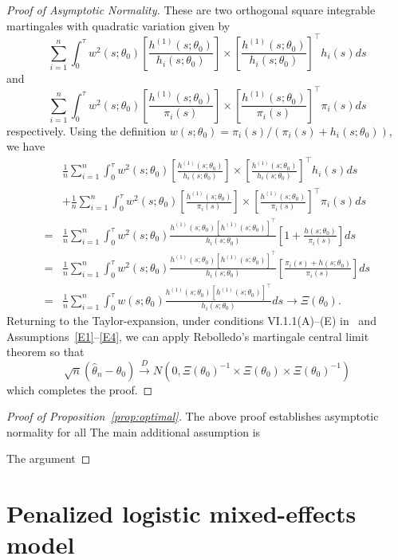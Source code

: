 \documentclass[11pt]{amsart}
\begin{document}
\begin{proof}[Proof of Asymptotic Normality]
These are two orthogonal square integrable martingales with quadratic variation given by
\[
\sum_{i=1}^n \int_0^\tau w^2(s;\theta_0) \left[ \frac{h^{(1)}(s; \theta_0)}{h_i (s;\theta_0)} \right] \times \left[ \frac{h^{(1)} (s;\theta_0)}{h_i (s;\theta_0)} \right]^\top h_i (s) ds
\]
and
\[
\sum_{i=1}^n \int_0^\tau w^2(s;\theta_0) \left[ \frac{h^{(1)}(s; \theta_0)}{\pi_i (s)} \right] \times \left[ \frac{h^{(1)} (s;\theta_0)}{\pi_i (s)} \right]^\top \pi_i (s) ds
\]
respectively.  Using the definition $w(s;\theta_0) = \pi_i(s) / (\pi_i(s)+h_i(s;\theta_0))$, we have
\begin{align*}
&\frac{1}{n} \sum_{i=1}^n \int_0^\tau w^2(s;\theta_0) \left[ \frac{h^{(1)}(s; \theta_0)}{h_i (s;\theta_0)} \right] \times \left[ \frac{h^{(1)} (s;\theta_0)}{h_i (s;\theta_0)} \right]^\top h_i (s) ds \\
&+
\frac{1}{n} \sum_{i=1}^n \int_0^\tau w^2(s;\theta_0) \left[ \frac{h^{(1)}(s; \theta_0)}{\pi_i (s)} \right] \times \left[ \frac{h^{(1)} (s;\theta_0)}{\pi_i (s)} \right]^\top \pi_i (s) ds \\
=& \frac{1}{n} \sum_{i=1}^n \int_0^\tau w^2(s;\theta_0) \frac{h^{(1)}(s; \theta_0) [h^{(1)} (s;\theta_0)]^\top}{h_i (s;\theta_0)} \left[ 1 + \frac{h(s;\theta_0)}{\pi_i (s)} \right] ds \\
=& \frac{1}{n} \sum_{i=1}^n \int_0^\tau w^2(s;\theta_0) \frac{h^{(1)}(s; \theta_0) [h^{(1)} (s;\theta_0)]^\top}{h_i (s;\theta_0)} \left[ \frac{\pi_i (s) + h(s;\theta_0)}{\pi_i (s)} \right] ds \\
=& \frac{1}{n} \sum_{i=1}^n \int_0^\tau w(s;\theta_0) \frac{h^{(1)}(s; \theta_0) [h^{(1)} (s;\theta_0)]^\top}{h_i (s;\theta_0)} ds
\to \Xi (\theta_0).
\end{align*}
Returning to the Taylor-expansion, under conditions VI.1.1(A)--(E) in~\cite{Andersen1993} and Assumptions~\ref{E1}--\ref{E4}, we can apply Rebolledo's martingale central limit theorem so that
$$
\sqrt{n} (\hat \theta_n - \theta_0) \overset{D}{\to} N(0, \Xi(\theta_0) ^{-1} \times \Xi(\theta_0) \times \Xi(\theta_0) ^{-1} )
$$
which completes the proof.
\end{proof}


\begin{proof}[Proof of Proposition~\ref{prop:optimal}]
The above proof establishes asymptotic normality for all
The main additional assumption is

The argument

\end{proof}

\section{Penalized logistic mixed-effects model}
\end{document}
